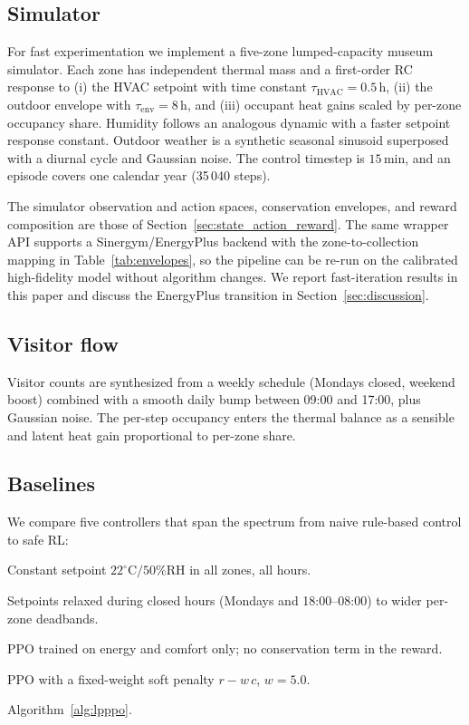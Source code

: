 \documentclass[11pt,a4paper]{article}
\begin{document}
\subsection{Simulator}\label{sec:simulator}

For fast experimentation we implement a five-zone lumped-capacity
museum simulator. Each zone has independent thermal mass and a
first-order RC response to (i) the HVAC setpoint with time constant
$\tau_{\text{HVAC}}=0.5\,\mathrm{h}$, (ii) the outdoor envelope with
$\tau_{\text{env}}=8\,\mathrm{h}$, and (iii) occupant heat gains scaled
by per-zone occupancy share. Humidity follows an analogous dynamic with
a faster setpoint response constant. Outdoor weather is a synthetic
seasonal sinusoid superposed with a diurnal cycle and Gaussian noise.
The control timestep is $15\,\mathrm{min}$, and an episode covers one
calendar year (35\,040 steps).

The simulator observation and action spaces, conservation envelopes,
and reward composition are those of
Section~\ref{sec:state_action_reward}. The same wrapper API supports a
Sinergym/EnergyPlus backend with the zone-to-collection mapping in
Table~\ref{tab:envelopes}, so the pipeline can be re-run on the
calibrated high-fidelity model without algorithm changes. We report
fast-iteration results in this paper and discuss the EnergyPlus
transition in Section~\ref{sec:discussion}.

\subsection{Visitor flow}

Visitor counts are synthesized from a weekly schedule (Mondays closed,
weekend boost) combined with a smooth daily bump between 09:00 and
17:00, plus Gaussian noise. The per-step occupancy enters the thermal
balance as a sensible and latent heat gain proportional to per-zone
share.

\subsection{Baselines}

We compare five controllers that span the spectrum from naive rule-based
control to safe RL:

\begin{description}[leftmargin=1.2em,style=nextline,nosep]
  \item[B1: Rule-fixed.] Constant setpoint $22^\circ\mathrm{C}/50\%\mathrm{RH}$ in all zones, all hours.
  \item[B2: Schedule.] Setpoints relaxed during closed hours (Mondays
        and 18:00--08:00) to wider per-zone deadbands.
  \item[B3: Vanilla-PPO.] PPO trained on energy and comfort only; no
        conservation term in the reward.
  \item[B4: Soft-PPO.] PPO with a fixed-weight soft penalty
        $r-w\,c$, $w=5.0$.
  \item[B5: Lagrangian-PPO (ours).] Algorithm~\ref{alg:lpppo}.
\end{description}
\end{document}
